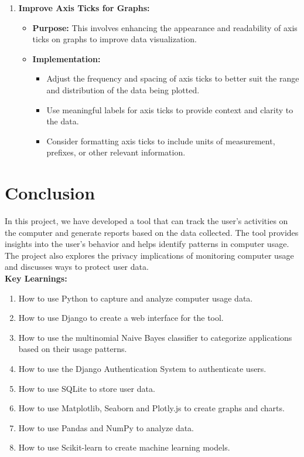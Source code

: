 \documentclass[openany]{report}
\begin{document}
\begin{enumerate}
    \item \textbf{Improve Axis Ticks for Graphs:}
          \begin{itemize}
              \item \textbf{Purpose:} This involves enhancing the appearance and readability of axis ticks on graphs to improve data visualization.
              \item \textbf{Implementation:}
                    \begin{itemize}
                        \item Adjust the frequency and spacing of axis ticks to better suit the range and distribution of the data being plotted.
                        \item Use meaningful labels for axis ticks to provide context and clarity to the data.
                        \item Consider formatting axis ticks to include units of measurement, prefixes, or other relevant information.
                    \end{itemize}
          \end{itemize}
\end{enumerate}


\chapter{Conclusion}
In this project, we have developed a tool that can track the user's activities on the computer and generate reports based on the data collected. The tool provides insights into the user's behavior and helps identify patterns in computer usage. The project also explores the privacy implications of monitoring computer usage and discusses ways to protect user data.\\

\textbf{Key Learnings:}
\begin{enumerate}
    \item How to use Python to capture and analyze computer usage data.
    \item How to use Django to create a web interface for the tool.
    \item How to use the multinomial Naive Bayes classifier to categorize applications based on their usage patterns.
    \item How to use the Django Authentication System to authenticate users.
    \item How to use SQLite to store user data.
    \item How to use Matplotlib, Seaborn and Plotly.js to create graphs and charts.
    \item How to use Pandas and NumPy to analyze data.
    \item How to use Scikit-learn to create machine learning models.
\end{enumerate}
\end{document}
